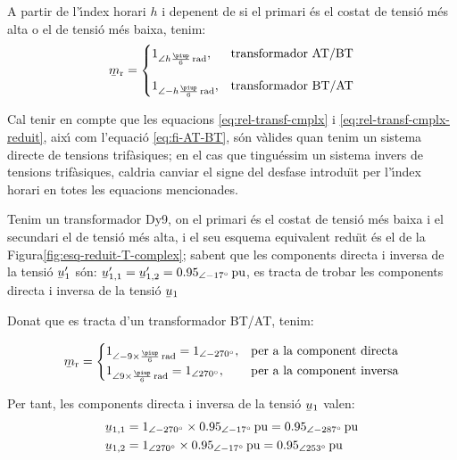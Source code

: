 A partir de l'\'{\i}ndex horari $h$ i depenent de si el primari \'{e}s el costat de tensi\'{o} m\'{e}s alta o el de tensi\'{o} m\'{e}s baixa, tenim:
\begin{equation}
\cmplx{m}\ped{r} = \begin{cases}
      1_{\angle h\frac{\piup}{6}\unit{rad}}, & \text{transformador AT/BT}\\[2.7ex]
      1_{\angle -h\frac{\piup}{6}\unit{rad}}, & \text{transformador BT/AT}
\end{cases}
\label{eq:rel-transf-cmplx-reduit}
\end{equation}

Cal tenir en compte que les equacions \eqref{eq:rel-transf-cmplx} i \eqref{eq:rel-transf-cmplx-reduit}, aix\'{\i} com l'equaci\'{o} \eqref{eq:fi-AT-BT}, s\'{o}n v\`{a}lides quan tenim un sistema directe de tensions trif\`{a}siques; en el cas que tingu\'{e}ssim un sistema invers de tensions trif\`{a}siques, caldria canviar el signe del desfase introdu\"{\i}t per l'\'{\i}ndex horari en totes les equacions mencionades.


\begin{exemple}
Tenim un transformador Dy9, on el primari \'{e}s el costat de tensi\'{o} m\'{e}s baixa  i el secundari el de tensi\'{o} m\'{e}s alta, i el seu esquema equivalent redu\"{\i}t \'{e}s el de la Figura\vref{fig:esq-reduit-T-complex}; sabent que les components directa i inversa de la tensi\'{o} $\cmplx{u}'_1$ s\'{o}n:
$\cmplx{u}'_{1,1}= \cmplx{u}'_{1,2} = \SIpd{0,95}{-17}{pu}$, es tracta de trobar les components directa i inversa de la tensi\'{o} $\cmplx{u}_1$

    Donat que es tracta d'un transformador BT/AT, tenim:

    \[
    \cmplx{m}\ped{r} = \begin{cases}
      1_{\angle -9\times\frac{\piup}{6}\unit{rad}} = \numpd{1}{-270}, & \text{per a la component directa}\\
      1_{\angle 9\times\frac{\piup}{6}\unit{rad}} = \numpd{1}{ 270}, & \text{per a la component inversa}
    \end{cases}
    \]

     Per tant, les components directa i inversa de la tensi\'{o}  $\cmplx{u}_1$ valen:
    \begin{align*}
    \cmplx{u}_{1,1} &= \numpd{1}{-270}\times \SIpd{0,95}{-17}{pu}  = \SIpd{0,95}{-287}{pu} \\
    \cmplx{u}_{1,2} &= \numpd{1}{ 270}\times \SIpd{0,95}{-17}{pu}  = \SIpd{0,95}{253}{pu}
    \end{align*}
\end{exemple}



